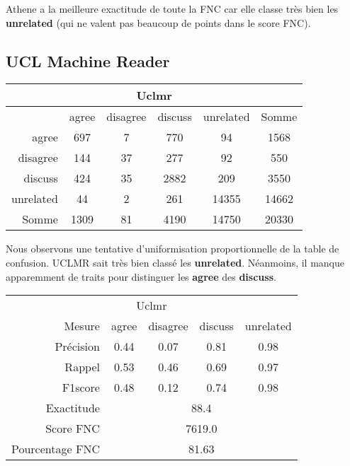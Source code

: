 \documentclass[onecolumn, 12pt]{article}
\begin{document}
Athene a la meilleure exactitude de toute la FNC car elle classe très bien les \textbf{unrelated} (qui ne valent pas beaucoup de points dans le score FNC).


\subsection{UCL Machine Reader}




\begin{center}
 \begin{tabular}{ r | c c c c | c }
  \multicolumn{6}{c}{Uclmr}                                  \\
  \hline
            & agree & disagree & discuss & unrelated & Somme \\
  \hline
  agree     & 697   & 7        & 770     & 94        & 1568  \\
  disagree  & 144   & 37       & 277     & 92        & 550   \\
  discuss   & 424   & 35       & 2882    & 209       & 3550  \\
  unrelated & 44    & 2        & 261     & 14355     & 14662 \\
  \hline
  Somme     & 1309  & 81       & 4190    & 14750     & 20330 \\
 \end{tabular}
\end{center}


Nous observons une tentative d'uniformisation proportionnelle de la table de confusion.
UCLMR sait très bien classé les \textbf{unrelated}. Néanmoins, il manque apparemment de traits pour distinguer les \textbf{agree} des \textbf{discuss}.


\begin{center}
 \begin{tabular}{ r | c c c c }
  \multicolumn{5}{c}{Uclmr}                                                     \\
  Mesure          & agree                      & disagree & discuss & unrelated \\
  \hline
  Précision       & 0.44                       & 0.07     & 0.81    & 0.98      \\
  Rappel          & 0.53                       & 0.46     & 0.69    & 0.97      \\
  F1score         & 0.48                       & 0.12     & 0.74    & 0.98      \\
  \hline
  \hline
  Exactitude      & \multicolumn{4}{c}{88.4}                                    \\
  Score FNC       & \multicolumn{4}{c}{7619.0}                                  \\
  Pourcentage FNC & \multicolumn{4}{c}{81.63}                                   \\
 \end{tabular}
\end{center}
\end{document}
